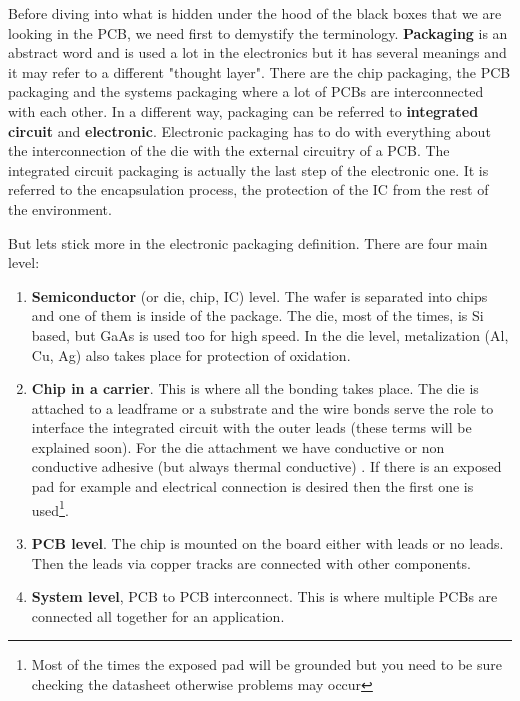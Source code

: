 \documentclass[final]{cubedoc}
\begin{document}
	Before diving into what is hidden under the hood of the black boxes that we are looking in the PCB, we need first to demystify the terminology. \textbf{Packaging} is an abstract word and is used a lot in the electronics but it has several meanings and it may refer to a different "thought layer". There are the chip packaging, the PCB packaging and the systems packaging where a lot of PCBs are interconnected with each other. In a different way, packaging can be referred to \textbf{integrated circuit} and \textbf{electronic}. Electronic packaging has to do with everything about the interconnection of the die with the external circuitry of a PCB. The integrated circuit packaging is actually the last step of the electronic one. It is referred to the encapsulation process, the protection of the IC from the rest of the environment.
	
	But lets stick more in the electronic packaging definition. There are four main level:
	
	\begin{enumerate}
		\item \textbf{Semiconductor} (or die, chip, IC) level. The wafer is separated into chips and one of them is inside of the package. The die, most of the times, is Si based, but GaAs is used too for high speed. In the die level, metalization (Al, Cu, Ag) also takes place for protection of oxidation.
		\item \textbf{Chip in a carrier}. This is where all the bonding takes place. The die is attached to a leadframe or a substrate  and the wire bonds serve the role to interface the integrated circuit with the outer leads (these terms will be explained soon). For the die attachment we have conductive or non conductive adhesive (but always thermal conductive) . If there is an exposed pad for example and electrical connection is desired then the first one is used\footnote{Most of the times the exposed pad will be grounded but you need to be sure checking the datasheet otherwise problems may occur}. 
		\item \textbf{PCB level}. The chip is mounted on the board either with leads or no leads. Then the leads via copper tracks are connected with other components.
		\item \textbf{System level}, PCB to PCB interconnect. This is where multiple PCBs are connected all together for an application.
	\end{enumerate}
	
\end{document}
